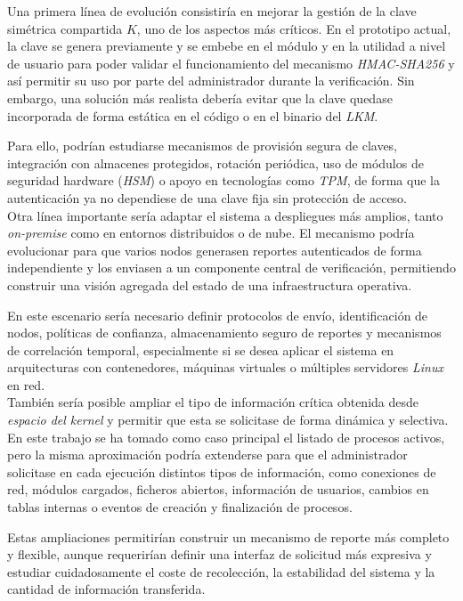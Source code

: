 Una primera línea de evolución consistiría en mejorar la gestión de la clave simétrica compartida \(K\), uno de los aspectos más críticos.
En el prototipo actual, la clave se genera previamente y se embebe en el módulo y en la utilidad a nivel de usuario para poder validar el funcionamiento del mecanismo \textit{HMAC-SHA256} y así permitir su uso por parte del administrador durante la verificación.
Sin embargo, una solución más realista debería evitar que la clave quedase incorporada de forma estática en el código o en el binario del \textit{LKM}.

Para ello, podrían estudiarse mecanismos de provisión segura de claves, integración con almacenes protegidos, rotación periódica, uso de módulos de seguridad hardware (\textit{HSM}) o apoyo en tecnologías como \textit{TPM}, de forma que la autenticación ya no dependiese de una clave fija sin protección de acceso.\\

Otra línea importante sería adaptar el sistema a despliegues más amplios, tanto \textit{on-premise} como en entornos distribuidos o de nube.
El mecanismo podría evolucionar para que varios nodos generasen reportes autenticados de forma independiente y los enviasen a un componente central de verificación, permitiendo construir una visión agregada del estado de una infraestructura operativa.

En este escenario sería necesario definir protocolos de envío, identificación de nodos, políticas de confianza, almacenamiento seguro de reportes y mecanismos de correlación temporal, especialmente si se desea aplicar el sistema en arquitecturas con contenedores, máquinas virtuales o múltiples servidores \textit{Linux} en red.\\

También sería posible ampliar el tipo de información crítica obtenida desde \textit{espacio del kernel} y permitir que esta se solicitase de forma dinámica y selectiva.
En este trabajo se ha tomado como caso principal el listado de procesos activos, pero la misma aproximación podría extenderse para que el administrador solicitase en cada ejecución distintos tipos de información, como conexiones de red, módulos cargados, ficheros abiertos, información de usuarios, cambios en tablas internas o eventos de creación y finalización de procesos.

Estas ampliaciones permitirían construir un mecanismo de reporte más completo y flexible, aunque requerirían definir una interfaz de solicitud más expresiva y estudiar cuidadosamente el coste de recolección, la estabilidad del sistema y la cantidad de información transferida.\\

